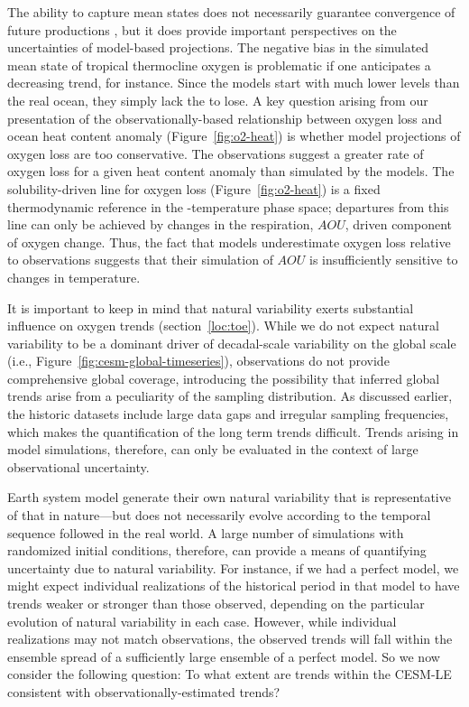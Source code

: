 \documentclass{report_chapter}
\begin{document}
The ability to capture mean states does not necessarily guarantee convergence of future productions \citep{Tagklis-Bracco-etal-2017}, but it does provide important perspectives on the uncertainties of model-based projections.
The negative bias in the simulated mean state of tropical thermocline oxygen is problematic if one anticipates a decreasing \OO{} trend, for instance.
Since the models start with much lower \OO{} levels than the real ocean, they simply lack the \OO{} to lose.
A key question arising from our presentation of the observationally-based relationship between oxygen loss and ocean heat content anomaly (Figure~\ref{fig:o2-heat}) is whether model projections of oxygen loss are too conservative.
The observations suggest a greater rate of oxygen loss for a given heat content anomaly than simulated by the models.
The solubility-driven line for oxygen loss (Figure~\ref{fig:o2-heat}) is a fixed thermodynamic reference in the \OO{}-temperature phase space; departures from this line can only be achieved by changes in the respiration, $AOU$, driven component of oxygen change.
Thus, the fact that models underestimate oxygen loss relative to observations suggests that their simulation of $AOU$ is insufficiently sensitive to changes in temperature.

It is important to keep in mind that natural variability exerts substantial influence on oxygen trends (section~\ref{loc:toe}).
While we do not expect natural variability to be a dominant driver of decadal-scale variability on the global scale (i.e., Figure~\ref{fig:cesm-global-timeseries}), observations do not provide comprehensive global coverage, introducing the possibility that inferred global trends arise from a peculiarity of the sampling distribution.
As discussed earlier, the historic \OO{} datasets include large data gaps and irregular sampling frequencies, which makes the quantification of the long term trends difficult.
Trends arising in model simulations, therefore, can only be evaluated in the context of large observational uncertainty.

Earth system model generate their own natural variability that is representative of that in nature---but does not necessarily evolve according to the temporal sequence followed in the real world.
A large number of simulations with randomized initial conditions, therefore, can provide a means of quantifying uncertainty due to natural variability.
For instance, if we had a perfect model, we might expect individual realizations of the historical period in that model to have trends weaker or stronger than those observed, depending on the particular evolution of natural variability in each case.
However, while individual realizations may not match observations, the observed trends will fall within the ensemble spread of a sufficiently large ensemble of a perfect model.
So we now consider the following question:
To what extent are \OO{} trends within the CESM-LE consistent with observationally-estimated trends?
\end{document}
